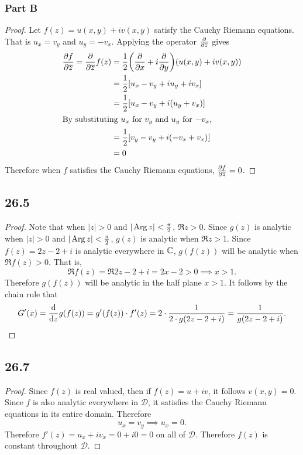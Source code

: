 \documentclass[12pt,titlepage]{extarticle}
\begin{document}
\subsubsection*{Part B}
\begin{proof}
    Let $f(z) = u(x,y) + iv(x,y)$ satisfy the Cauchy Riemann equations. That is $u_x = v_y$ and $u_y = -v_x$. Applying the operator $\pdv{\overline{z}}$ gives
    \begin{align*}
        \pdv{f}{\overline{z}} = \pdv{\overline{z}} f(z) &= \frac{1}{2} \qty(\pdv{x} + i\pdv{y}) (u(x,y) + i v(x,y)) \\
                            &= \frac{1}{2} \qty[
                            u_x - v_y + i u_y + i v_x
                            ] \\
                            &= \frac{1}{2} \qty[
                            u_x - v_y + i (u_y + v_x)
                            ] \\
        \intertext{By substituting $u_x$ for $v_y$ and $u_y$ for $-v_x$,}
                            &= \frac{1}{2} \qty[
                            v_y - v_y + i (-v_x + v_x)
                            ] \\
                            &= 0
    \end{align*}
    Therefore when $f$ satisfies the Cauchy Riemann equations, $\pdv{f}{\overline{z}} = 0$.
\end{proof}

\subsection*{26.5} %
\begin{proof}
    Note that when $|z| > 0$ and $|\operatorname{Arg}{z}| < \frac{\pi}{2}$, $\Re{z} > 0$. Since $g(z)$ is analytic when $|z| > 0$ and $|\operatorname{Arg}{z}| < \frac{\pi}{2}$, $g(z)$ is analytic when $\Re{z} > 1$. Since $f(z) = 2z - 2 + i$ is analytic everywhere in $\mathbb{C}$, $g(f(z))$ will be analytic when $\Re{f(z)} > 0$. That is,
    \[
        \Re f(z) = \Re{2z - 2 + i} = 2x - 2 > 0 \implies x > 1
    .\]
    Therefore $g(f(z))$ will be analytic in the half plane $x > 1$. It follows by the chain rule that
    \[
        G'(x) = \dv{z} g(f(z)) = g'(f(z)) \cdot f'(z) = 2 \cdot \frac{1}{2\cdot g(2z - 2 + i)} = \frac{1}{g(2z - 2 + i)}
    .\]
\end{proof}

\subsection*{26.7}
\begin{proof}
    Since $f(z)$ is real valued, then if $f(z) = u + iv$, it follows $v(x,y) = 0$. Since $f$ is also analytic everywhere in $\mathcal{D}$, it satisfies the Cauchy Riemann equations in its entire domain. Therefore
    \[
        u_x = v_y \implies u_x = 0
    .\]
    Therefore $f'(z) = u_x + i v_x = 0 + i 0 = 0$ on all of $\mathcal{D}$. Therefore $f(z)$ is constant throughout $\mathcal{D}$.
\end{proof}
\end{document}
